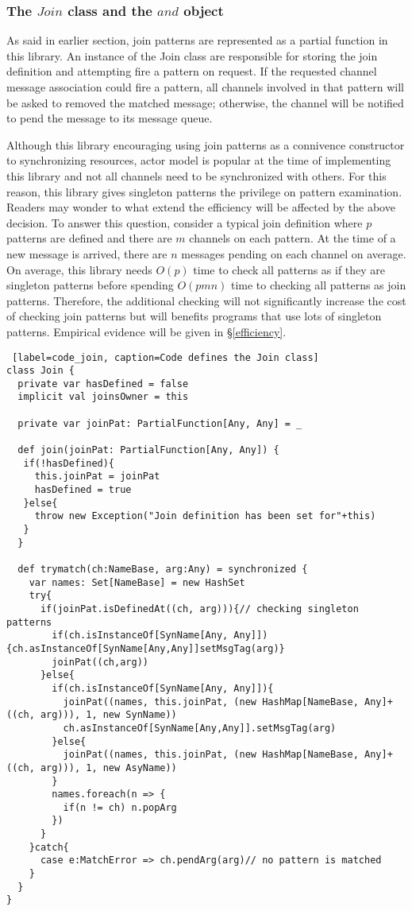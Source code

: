 \subsubsection{The $Join$ class and the $and$ object}
As said in earlier section, join patterns are represented as a partial function in this library.  An instance of the Join class are responsible for storing the join definition and attempting fire a pattern on request.  If the requested channel message association could fire a pattern, all channels involved in that pattern will be asked to removed the matched message;  otherwise, the channel will be notified to pend the message to its message queue.

Although this library encouraging using join patterns as a connivence constructor to synchronizing resources, actor model is popular at the time of implementing this library and not all channels need to be synchronized with others.  For this reason, this library gives singleton patterns the privilege on pattern examination.  Readers may wonder to what extend the efficiency will be affected by the above decision.  To answer this question, consider a typical join definition where $p$ patterns are defined and there are $m$ channels on each pattern.  At the time of a new message is arrived, there are $n$ messages pending on each channel on average.  On average, this library needs $O(p)$ time to check all patterns as if they are singleton patterns before spending $O(pmn)$ time to checking all patterns as join patterns.  Therefore, the additional checking will not significantly increase the cost of checking join patterns but will benefits programs that use lots of singleton patterns.  Empirical evidence will be given in \S\ref{efficiency}.

\newpage
\begin{lstlisting} [label=code_join, caption=Code defines the Join class]
class Join {
  private var hasDefined = false
  implicit val joinsOwner = this
  
  private var joinPat: PartialFunction[Any, Any] = _

  def join(joinPat: PartialFunction[Any, Any]) { 
   if(!hasDefined){
     this.joinPat = joinPat
     hasDefined = true
   }else{
     throw new Exception("Join definition has been set for"+this)
   }
  }
   
  def trymatch(ch:NameBase, arg:Any) = synchronized {
    var names: Set[NameBase] = new HashSet
    try{
      if(joinPat.isDefinedAt((ch, arg))){// checking singleton patterns
        if(ch.isInstanceOf[SynName[Any, Any]]) {ch.asInstanceOf[SynName[Any,Any]]setMsgTag(arg)}
        joinPat((ch,arg))
      }else{
        if(ch.isInstanceOf[SynName[Any, Any]]){
          joinPat((names, this.joinPat, (new HashMap[NameBase, Any]+((ch, arg))), 1, new SynName))            
          ch.asInstanceOf[SynName[Any,Any]].setMsgTag(arg)          
        }else{
          joinPat((names, this.joinPat, (new HashMap[NameBase, Any]+((ch, arg))), 1, new AsyName))
        }
        names.foreach(n => {
          if(n != ch) n.popArg
        })
      }
    }catch{
      case e:MatchError => ch.pendArg(arg)// no pattern is matched
    }
  }
}
\end{lstlisting}


